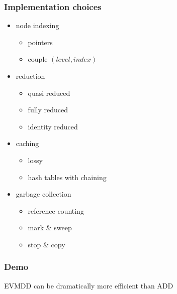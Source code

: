 \documentclass{beamer}
\begin{document}
\begin{frame}
  \frametitle{Implementation choices}
  \begin{itemize}
  \item node indexing
    \begin{itemize}
    \item pointers
    \item couple $(level, index)$
    \end{itemize}
    \pause
  \item reduction
    \begin{itemize}
    \item quasi reduced
    \item fully reduced
    \item identity reduced
    \end{itemize}
    \pause
  \item caching
    \begin{itemize}
    \item lossy
    \item hash tables with chaining
    \end{itemize}
    \pause
  \item garbage collection
    \begin{itemize}
    \item reference counting
    \item mark \& sweep
    \item stop \& copy
    \end{itemize}
  \end{itemize}
\end{frame}

\begin{frame}
  \frametitle{Demo}
  EVMDD can be dramatically more efficient than ADD
\end{frame}
\end{document}
